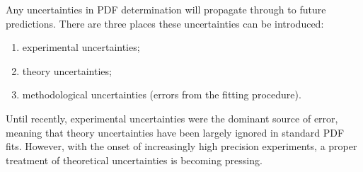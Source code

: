 \documentclass[a4paper,12pt,oneside,openright]{book}
\numberwithin{equation}{section}
\numberwithin{figure}{section}
\numberwithin{table}{section}
\begin{document}
Any uncertainties in PDF determination will propagate through to future predictions. There are three
places these uncertainties can be introduced:
\begin{enumerate}
\item experimental uncertainties;
\item theory uncertainties;
\item methodological uncertainties (errors from the fitting procedure).
\end{enumerate}
Until recently, experimental uncertainties were the dominant source of error, meaning that theory uncertainties have been largely ignored in standard PDF fits.
However, with the onset of increasingly high precision experiments, a proper treatment of theoretical uncertainties is becoming pressing.

\mainmatter
\eighteenptleading








\appendix
{}



\backmatter

\singlespace

{}


\end{document}
